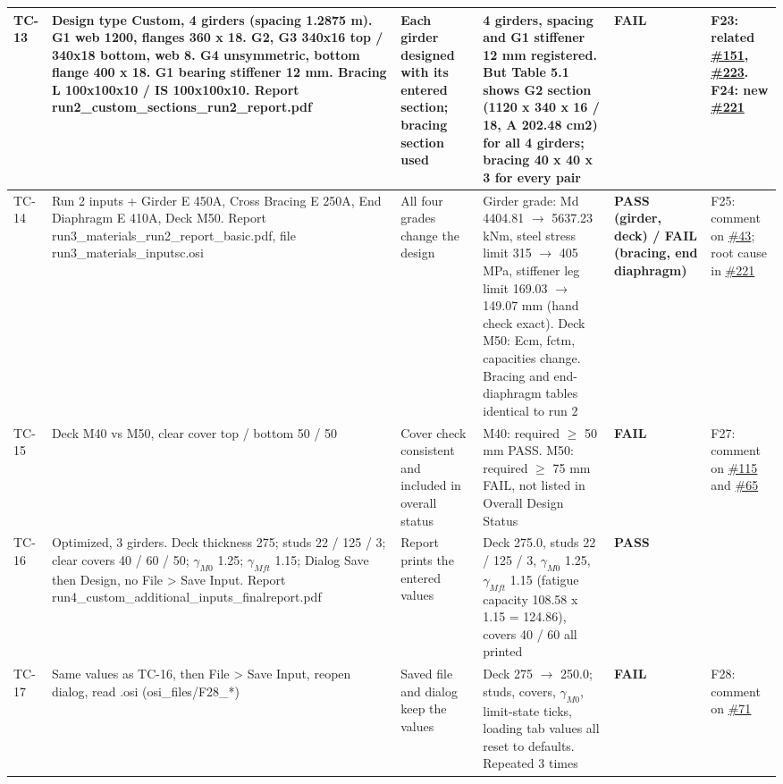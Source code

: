 \documentclass[10pt,a4paper]{article}
\begin{document}
{\begin{longtable}{|p{1.2cm}|p{6.2cm}|p{3.6cm}|p{7.2cm}|p{1.8cm}|p{3.6cm}|}
TC-13 & Design type Custom, 4 girders (spacing 1.2875 m). G1 web 1200, flanges 360 x 18. G2, G3 340x16 top / 340x18 bottom, web 8. G4 unsymmetric, bottom flange 400 x 18. G1 bearing stiffener 12 mm. Bracing L 100x100x10 / IS 100x100x10. Report run2\_custom\_sections\_run2\_report.pdf & Each girder designed with its entered section; bracing section used & 4 girders, spacing and G1 stiffener 12 mm registered. But Table 5.1 shows G2 section (1120 x 340 x 16 / 18, A 202.48 cm2) for all 4 girders; bracing 40 x 40 x 3 for every pair & \textcolor{failc}{\textbf{FAIL}} & F23: related \href{https://github.com/Nidhikhare12/OsdagBridge/issues/151}{\#151}, \href{https://github.com/Nidhikhare12/OsdagBridge/issues/223}{\#223}. F24: new \href{https://github.com/Nidhikhare12/OsdagBridge/issues/221}{\#221} \\ \hline
TC-14 & Run 2 inputs + Girder E 450A, Cross Bracing E 250A, End Diaphragm E 410A, Deck M50. Report run3\_materials\_run2\_report\_basic.pdf, file run3\_materials\_inputsc.osi & All four grades change the design & Girder grade: Md 4404.81 $\rightarrow$ 5637.23 kNm, steel stress limit 315 $\rightarrow$ 405 MPa, stiffener leg limit 169.03 $\rightarrow$ 149.07 mm (hand check exact). Deck M50: Ecm, fctm, capacities change. Bracing and end-diaphragm tables identical to run 2 & \textcolor{failc}{\textbf{PASS (girder, deck) / FAIL (bracing, end diaphragm)}} & F25: comment on \href{https://github.com/Nidhikhare12/OsdagBridge/issues/43}{\#43}; root cause in \href{https://github.com/Nidhikhare12/OsdagBridge/issues/221}{\#221} \\ \hline
TC-15 & Deck M40 vs M50, clear cover top / bottom 50 / 50 & Cover check consistent and included in overall status & M40: required $\geq$ 50 mm PASS. M50: required $\geq$ 75 mm FAIL, not listed in Overall Design Status & \textcolor{failc}{\textbf{FAIL}} & F27: comment on \href{https://github.com/Nidhikhare12/OsdagBridge/issues/115}{\#115} and \href{https://github.com/Nidhikhare12/OsdagBridge/issues/65}{\#65} \\ \hline
TC-16 & Optimized, 3 girders. Deck thickness 275; studs 22 / 125 / 3; clear covers 40 / 60 / 50; $\gamma_{M0}$ 1.25; $\gamma_{Mft}$ 1.15; Dialog Save then Design, no File > Save Input. Report run4\_custom\_additional\_inputs\_finalreport.pdf & Report prints the entered values & Deck 275.0, studs 22 / 125 / 3, $\gamma_{M0}$ 1.25, $\gamma_{Mft}$ 1.15 (fatigue capacity 108.58 x 1.15 = 124.86), covers 40 / 60 all printed & \textcolor{passc}{\textbf{PASS}} &  \\ \hline
TC-17 & Same values as TC-16, then File > Save Input, reopen dialog, read .osi (osi\_files/F28\_*) & Saved file and dialog keep the values & Deck 275 $\rightarrow$ 250.0; studs, covers, $\gamma_{M0}$, limit-state ticks, loading tab values all reset to defaults. Repeated 3 times & \textcolor{failc}{\textbf{FAIL}} & F28: comment on \href{https://github.com/Nidhikhare12/OsdagBridge/issues/71}{\#71} \\ \hline

\end{longtable}}
\end{document}
